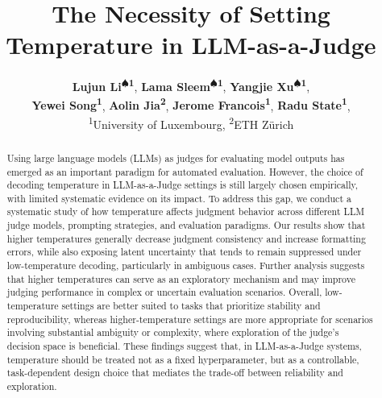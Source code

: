\documentclass[11pt]{article}
\title{The Necessity of Setting Temperature in LLM-as-a-Judge}
\author{
 \textbf{Lujun Li\textsuperscript{$\spadesuit$1}},
 \textbf{Lama Sleem\textsuperscript{$\spadesuit$1}},
 \textbf{Yangjie Xu\textsuperscript{$\spadesuit$1}},
 \\
 \textbf{Yewei Song\textsuperscript{1}},
  \textbf{Aolin Jia\textsuperscript{2}},
 \textbf{Jerome Francois\textsuperscript{1}},
 \textbf{Radu State\textsuperscript{1}},
\\
 \textsuperscript{1}University of Luxembourg,
 \textsuperscript{2}ETH Zürich
\\
}
\begin{document}
 \maketitle
\begin{abstract}

Using large language models (LLMs) as judges for evaluating model outputs has emerged as an important paradigm for automated evaluation. However, the choice of decoding temperature in LLM-as-a-Judge settings is still largely chosen empirically, with limited systematic evidence on its impact. To address this gap, we conduct a systematic study of how temperature affects judgment behavior across different LLM judge models, prompting strategies, and evaluation paradigms. Our results show that higher temperatures generally decrease judgment consistency and increase formatting errors, while also exposing latent uncertainty that tends to remain suppressed under low-temperature decoding, particularly in ambiguous cases. Further analysis suggests that higher temperatures can serve as an exploratory mechanism and may improve judging performance in complex or uncertain evaluation scenarios. Overall, low-temperature settings are better suited to tasks that prioritize stability and reproducibility, whereas higher-temperature settings are more appropriate for scenarios involving substantial ambiguity or complexity, where exploration of the judge’s decision space is beneficial. These findings suggest that, in LLM-as-a-Judge systems, temperature should be treated not as a fixed hyperparameter, but as a controllable, task-dependent design choice that mediates the trade-off between reliability and exploration.
\end{abstract}
\end{document}
